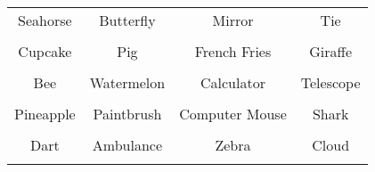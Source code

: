 \documentclass[12pt,a4paper]{article}
\begin{document}
\thispagestyle{empty}
\begin{table}[]
\centering
\Huge
\begin{tabular}{cccc}
 Seahorse& Butterfly& Mirror& Tie\\  & & & \\
 Cupcake& Pig& French Fries& Giraffe\\  & & & \\
 Bee& Watermelon& Calculator& Telescope\\  & & & \\
 Pineapple& Paintbrush& Computer Mouse& Shark\\  & & & \\
 Dart& Ambulance& Zebra& Cloud\\  & & & \\
\end{tabular}
\end{table}
\end{document}
